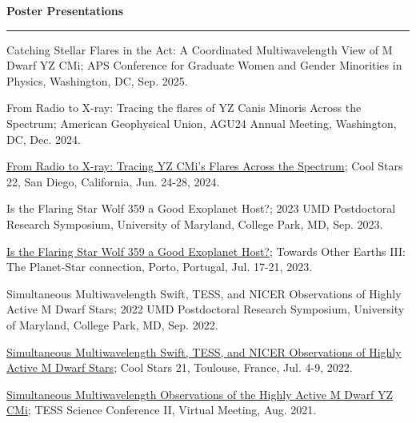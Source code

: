 \documentclass[12pt]{article}
\begin{document}
\noindent
{\bf Poster Presentations} \\
\vspace{-10mm}
\begin{center}
\rule{\textwidth}{0.2mm}
\end{center}
\vspace{-3mm}
\noindent
\begin{etaremune}
\renewcommand\labelenumi{\bfseries\theenumi .}

\item Catching Stellar Flares in the Act: A Coordinated Multiwavelength View of M Dwarf YZ CMi; APS Conference for Graduate Women and Gender Minorities in Physics, Washington, DC, Sep. 2025.

\item From Radio to X-ray: Tracing the flares of YZ Canis Minoris Across the Spectrum; American Geophysical Union, AGU24 Annual Meeting, Washington, DC, Dec. 2024.

\item \href{https://coolstars22.github.io/docs/CS22_Abstract_booklet.pdf}{From Radio to X-ray: Tracing YZ CMi's Flares Across the
Spectrum}; Cool Stars 22, San Diego, California, Jun. 24-28, 2024.

\item Is the Flaring Star Wolf 359 a Good Exoplanet Host?; 2023 UMD Postdoctoral Research Symposium, University of Maryland, College Park, MD, Sep. 2023.

\item \href{http://www.astro.up.pt/~sousasag/toe2023/Abstract_book_Posters.pdf}{Is the Flaring Star Wolf 359 a Good Exoplanet Host?}; Towards Other Earths III: The Planet-Star connection, Porto, Portugal, Jul. 17-21, 2023.

\item Simultaneous Multiwavelength Swift, TESS, and NICER Observations of Highly Active M Dwarf Stars; 2022 UMD Postdoctoral Research Symposium, University of Maryland, College Park, MD, Sep. 2022.

\item \href{https://coolstars21.github.io/docs/CS21booklet.pdf}{Simultaneous Multiwavelength Swift, TESS, and NICER Observations of Highly Active M Dwarf Stars}; Cool Stars 21, Toulouse, France, Jul. 4-9, 2022.

\item \href{https://zenodo.org/record/5142127#.YmbZsJPMJCV}{Simultaneous Multiwavelength Observations of the Highly Active M Dwarf YZ CMi}; TESS Science Conference II, Virtual Meeting, Aug. 2021.


\end{etaremune}
\end{document}
